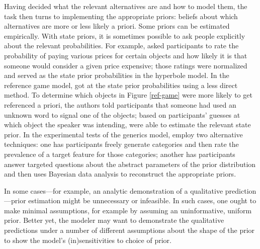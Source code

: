 \documentclass{sp}
\newcommand{\gcs}[1]{\textcolor{blue}{[gcs: #1]}}
\newcommand{\mf}[1]{\textcolor{orange}{[mf: #1]}}
\newcommand{\mht}[1]{\textcolor{purple}{[mht: #1]}}
\begin{document}
Having decided what the relevant alternatives are and how to model them, the task then turns to implementing the appropriate priors: beliefs about which alternatives are more or less likely a priori. Some priors can be estimated empirically. With state priors, it is sometimes possible to ask people explicitly about the relevant probabilities. For example, \cite{kaoetal2014} asked participants to rate the probability of paying various prices for certain objects and how likely it is that someone would consider a given price expensive; those ratings were normalized and served as the state prior probabilities in the hyperbole model. In the reference game model, \cite{frankgoodman2012} got at the state prior probabilities using a less direct method. To determine which objects in Figure \ref{ref-game} were more likely to get referenced a priori, the authors told participants that someone had used an unknown word to signal one of the objects; based on participants' guesses at which object the speaker was intending, \citeauthor{frankgoodman2012} were able to estimate the relevant state prior.
In the experimental tests of the generics model, \cite{tesslergoodman2019} employ two alternative techniques: one has participants freely generate categories and then rate the prevalence of a target feature for those categories; another has participants answer targeted questions about the abstract parameters of the prior distribution and then uses Bayesian data analysis to reconstruct the appropriate priors. %


In some cases---for example, an analytic demonstration of a qualitative prediction---prior estimation might be unnecessary or infeasible. In such cases, one ought to make minimal assumptions, for example by assuming an uninformative, uniform prior. Better yet, the modeler may want to demonstrate the qualitative predictions under a number of different assumptions about the shape of the prior to show the model's (in)sensitivities to choice of prior.

\end{document}
